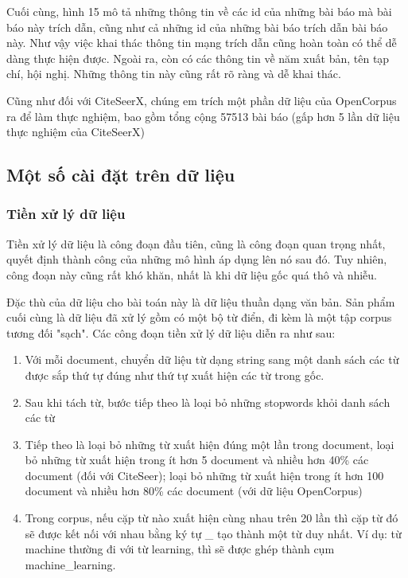 \documentclass[12pt,a4paper]{article}
\begin{document}
\noindent
Cuối cùng, hình 15 mô tả những thông tin về các id của những bài báo mà bài báo này trích dẫn, cũng như cả những id của những bài báo trích dẫn bài báo này. Như vậy việc khai thác thông tin mạng trích dẫn cũng hoàn toàn có thể dễ dàng thực hiện được. Ngoài ra, còn có các thông tin về năm xuất bản, tên tạp chí, hội nghị. Những thông tin này cũng rất rõ ràng và dễ khai thác.


Cũng như đối với CiteSeerX, chúng em trích một phần dữ liệu của OpenCorpus ra để làm thực nghiệm, bao gồm tổng cộng 57513 bài báo (gấp hơn 5 lần dữ liệu thực nghiệm của CiteSeerX)

\subsection{Một số cài đặt trên dữ liệu}
\subsubsection{Tiền xử lý dữ liệu}

Tiền xử lý dữ liệu là công đoạn đầu tiên, cũng là công đoạn quan trọng nhất, quyết định thành công của những mô hình áp dụng lên nó sau đó. Tuy nhiên, công đoạn này cũng rất khó khăn, nhất là khi dữ liệu gốc quá thô và nhiễu. 


Đặc thù của dữ liệu cho bài toán này là dữ liệu thuần dạng văn bản. Sản phẩm cuối cùng là dữ liệu đã xử lý gồm có một bộ từ điển, đi kèm là một tập corpus tương đối "sạch". Các công đoạn tiền xử lý dữ liệu diễn ra như sau:

\begin{enumerate}
\item Với mỗi document, chuyển dữ liệu từ dạng string sang một danh sách các từ được sắp thứ tự đúng như thứ tự xuất hiện các từ trong  gốc.
\item Sau khi tách từ, bước tiếp theo là loại bỏ những stopwords khỏi danh sách các từ
\item Tiếp theo là loại bỏ những từ xuất hiện đúng một lần trong document, loại bỏ những từ xuất hiện trong ít hơn 5 document và nhiều hơn 40\% các document (đối với CiteSeer); loại bỏ những từ xuất hiện trong ít hơn 100 document và nhiều hơn 80\% các document (với dữ liệu OpenCorpus)
\item Trong corpus, nếu cặp từ nào xuất hiện cùng nhau trên 20 lần thì cặp từ đó sẽ được kết nối với nhau bằng ký tự \_ tạo thành một từ duy nhất. Ví dụ: từ machine thường đi với từ learning, thì sẽ được ghép thành cụm machine{\_}learning.
\end{enumerate}
\end{document}
